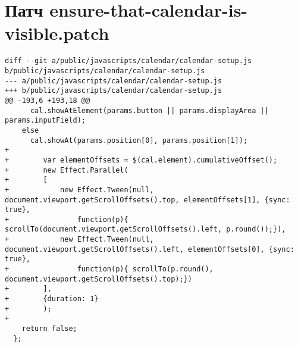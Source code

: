 \section{Патч ensure-that-calendar-is-visible.patch}
\label{appendix:ensure-that-calendar-is-visible.patch}
\begin{lstlisting}
diff --git a/public/javascripts/calendar/calendar-setup.js b/public/javascripts/calendar/calendar-setup.js
--- a/public/javascripts/calendar/calendar-setup.js
+++ b/public/javascripts/calendar/calendar-setup.js
@@ -193,6 +193,18 @@
      cal.showAtElement(params.button || params.displayArea || params.inputField);
    else
      cal.showAt(params.position[0], params.position[1]);
+
+        var elementOffsets = $(cal.element).cumulativeOffset();
+        new Effect.Parallel(
+        [
+            new Effect.Tween(null, document.viewport.getScrollOffsets().top, elementOffsets[1], {sync: true},
+                function(p){ scrollTo(document.viewport.getScrollOffsets().left, p.round());}),
+            new Effect.Tween(null, document.viewport.getScrollOffsets().left, elementOffsets[0], {sync: true},
+                function(p){ scrollTo(p.round(), document.viewport.getScrollOffsets().top);})
+        ],
+        {duration: 1}
+        );
+
    return false;
  };
\end{lstlisting}

